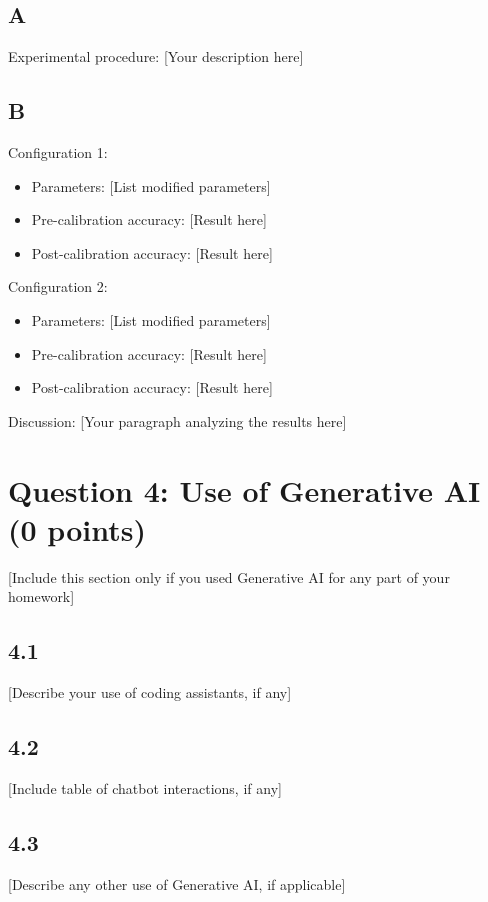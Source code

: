 \documentclass{article}
\begin{document}
\subsection*{A}
Experimental procedure: [Your description here]

\subsection*{B}
Configuration 1:
\begin{itemize}
    \item Parameters: [List modified parameters]
    \item Pre-calibration accuracy: [Result here]
    \item Post-calibration accuracy: [Result here]
\end{itemize}
\newline
Configuration 2:
\begin{itemize}
    \item Parameters: [List modified parameters]
    \item Pre-calibration accuracy: [Result here]
    \item Post-calibration accuracy: [Result here]
\end{itemize}
\newline
Discussion: [Your paragraph analyzing the results here]

\section*{Question 4: Use of Generative AI (0 points)}
[Include this section only if you used Generative AI for any part of your homework]

\subsection*{4.1}
[Describe your use of coding assistants, if any]

\subsection*{4.2}
[Include table of chatbot interactions, if any]

\subsection*{4.3}
[Describe any other use of Generative AI, if applicable]
\end{document}
